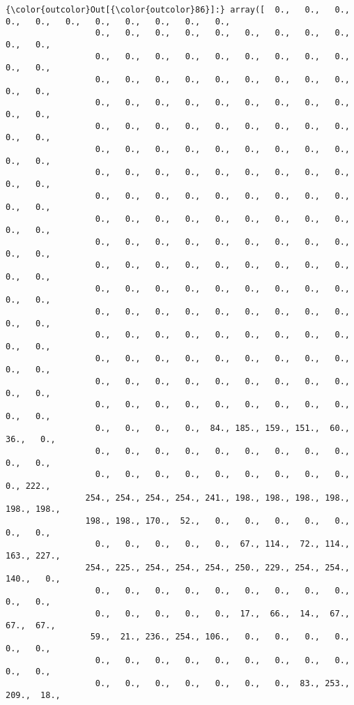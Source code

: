 \documentclass[11pt]{article}
\begin{document}
\begin{Verbatim}[commandchars=\\\{\}]
{\color{outcolor}Out[{\color{outcolor}86}]:} array([  0.,   0.,   0.,   0.,   0.,   0.,   0.,   0.,   0.,   0.,   0.,
                  0.,   0.,   0.,   0.,   0.,   0.,   0.,   0.,   0.,   0.,   0.,
                  0.,   0.,   0.,   0.,   0.,   0.,   0.,   0.,   0.,   0.,   0.,
                  0.,   0.,   0.,   0.,   0.,   0.,   0.,   0.,   0.,   0.,   0.,
                  0.,   0.,   0.,   0.,   0.,   0.,   0.,   0.,   0.,   0.,   0.,
                  0.,   0.,   0.,   0.,   0.,   0.,   0.,   0.,   0.,   0.,   0.,
                  0.,   0.,   0.,   0.,   0.,   0.,   0.,   0.,   0.,   0.,   0.,
                  0.,   0.,   0.,   0.,   0.,   0.,   0.,   0.,   0.,   0.,   0.,
                  0.,   0.,   0.,   0.,   0.,   0.,   0.,   0.,   0.,   0.,   0.,
                  0.,   0.,   0.,   0.,   0.,   0.,   0.,   0.,   0.,   0.,   0.,
                  0.,   0.,   0.,   0.,   0.,   0.,   0.,   0.,   0.,   0.,   0.,
                  0.,   0.,   0.,   0.,   0.,   0.,   0.,   0.,   0.,   0.,   0.,
                  0.,   0.,   0.,   0.,   0.,   0.,   0.,   0.,   0.,   0.,   0.,
                  0.,   0.,   0.,   0.,   0.,   0.,   0.,   0.,   0.,   0.,   0.,
                  0.,   0.,   0.,   0.,   0.,   0.,   0.,   0.,   0.,   0.,   0.,
                  0.,   0.,   0.,   0.,   0.,   0.,   0.,   0.,   0.,   0.,   0.,
                  0.,   0.,   0.,   0.,   0.,   0.,   0.,   0.,   0.,   0.,   0.,
                  0.,   0.,   0.,   0.,   0.,   0.,   0.,   0.,   0.,   0.,   0.,
                  0.,   0.,   0.,   0.,  84., 185., 159., 151.,  60.,  36.,   0.,
                  0.,   0.,   0.,   0.,   0.,   0.,   0.,   0.,   0.,   0.,   0.,
                  0.,   0.,   0.,   0.,   0.,   0.,   0.,   0.,   0.,   0., 222.,
                254., 254., 254., 254., 241., 198., 198., 198., 198., 198., 198.,
                198., 198., 170.,  52.,   0.,   0.,   0.,   0.,   0.,   0.,   0.,
                  0.,   0.,   0.,   0.,   0.,  67., 114.,  72., 114., 163., 227.,
                254., 225., 254., 254., 254., 250., 229., 254., 254., 140.,   0.,
                  0.,   0.,   0.,   0.,   0.,   0.,   0.,   0.,   0.,   0.,   0.,
                  0.,   0.,   0.,   0.,   0.,  17.,  66.,  14.,  67.,  67.,  67.,
                 59.,  21., 236., 254., 106.,   0.,   0.,   0.,   0.,   0.,   0.,
                  0.,   0.,   0.,   0.,   0.,   0.,   0.,   0.,   0.,   0.,   0.,
                  0.,   0.,   0.,   0.,   0.,   0.,   0.,  83., 253., 209.,  18.,

\end{Verbatim}
\end{document}

